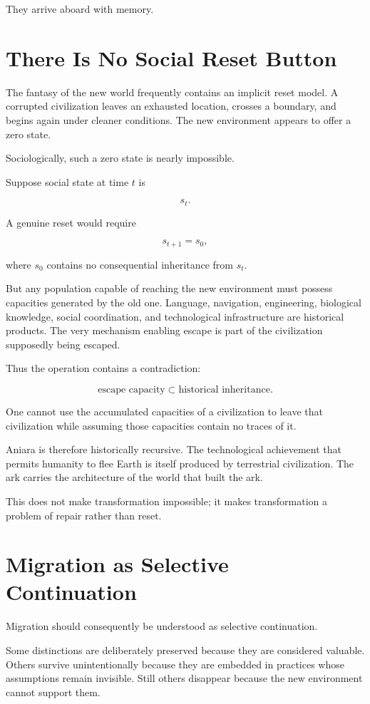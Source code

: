 \documentclass[11pt,oneside]{book}
\theoremstyle{definition}
\theoremstyle{remark}
\begin{document}
They arrive aboard with memory.

\section{There Is No Social Reset Button}

The fantasy of the new world frequently contains an implicit reset model. A corrupted civilization leaves an exhausted location, crosses a boundary, and begins again under cleaner conditions. The new environment appears to offer a zero state.

Sociologically, such a zero state is nearly impossible.

Suppose social state at time \(t\) is

\[
s_t.
\]

A genuine reset would require

\[
s_{t+1}=s_0,
\]

where \(s_0\) contains no consequential inheritance from \(s_t\).

But any population capable of reaching the new environment must possess capacities generated by the old one. Language, navigation, engineering, biological knowledge, social coordination, and technological infrastructure are historical products. The very mechanism enabling escape is part of the civilization supposedly being escaped.

Thus the operation contains a contradiction:

\[
\text{escape capacity}
\subset
\text{historical inheritance}.
\]

One cannot use the accumulated capacities of a civilization to leave that civilization while assuming those capacities contain no traces of it.

Aniara is therefore historically recursive. The technological achievement that permits humanity to flee Earth is itself produced by terrestrial civilization. The ark carries the architecture of the world that built the ark.

This does not make transformation impossible; it makes transformation a problem of repair rather than reset.

\section{Migration as Selective Continuation}

Migration should consequently be understood as selective continuation.

Some distinctions are deliberately preserved because they are considered valuable. Others survive unintentionally because they are embedded in practices whose assumptions remain invisible. Still others disappear because the new environment cannot support them.
\end{document}
